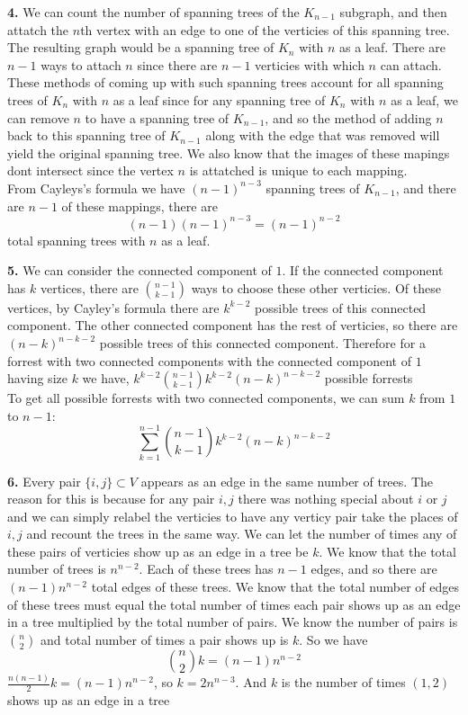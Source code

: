 \documentclass[12pt]{article}
\newenvironment{ques}{\vspace{2 ex}}{\vspace{2 ex}}
\theoremstyle{definition}
\begin{document}
\begin{ques}
	\textbf{4.}
		We can count the number of spanning trees of the $K_{n-1}$
		subgraph, and then attatch the $n$th vertex with an edge to one
		of the verticies of this spanning tree. The resulting graph
		would be a spanning tree of $K_n$ with $n$ as a leaf. There are
		$n-1$ ways to attach $n$ since there are $n-1$ verticies with
		which $n$ can attach. These methods of coming up with such
		spanning
		trees account for all spanning trees of $K_n$ with $n$ as a
		leaf since for any spanning tree of $K_n$ with
		$n$ as a leaf, we can remove $n$ to have a spanning tree of
		$K_{n-1}$, and so the method of adding $n$ back to this
		spanning tree of $K_{n-1}$ along with the edge that was removed
		will yield the original spanning tree. We also know that the
		images of these mapings dont intersect since the vertex $n$ is
		attatched is unique to each mapping.\\
		From Cayleys's formula we have $(n-1)^{n-3}$ spanning trees of
		$K_{n-1}$, and there are $n-1$ of these mappings, there are
		$$(n-1)(n-1)^{n-3} = (n-1)^{n-2}$$
		total spanning trees with $n$ as a leaf.
\end{ques}

\begin{ques}
	\textbf{5.}
		We can consider the connected component of $1$. If the
		connected component has $k$ vertices, there are
		$\binom{n-1}{k-1}$ ways to choose these other verticies. Of these
		vertices, by Cayley's formula there are $k^{k-2}$ possible
		trees of this connected component. The other connected
		component has the rest of verticies, so there are
		$(n-k)^{n-k-2}$ possible trees of this connected component.
		Therefore for a forrest with two connected components with the
		connected component of $1$ having size $k$ we have,
		$k^{k-2}\binom{n-1}{k-1}k^{k-2}(n-k)^{n-k-2}$ possible forrests\\
		To get all possible forrests with two connected components, we
		can sum $k$ from $1$ to $n-1$:
		$$\sum_{k=1}^{n-1}\binom{n-1}{k-1}k^{k-2}(n-k)^{n-k-2}$$
\end{ques}

\begin{ques}
	\textbf{6.}
		Every pair $\{i,j\} \subset V$ appears as an edge in the same
		number of trees. The reason for this is because for any pair
		$i,j$ there was nothing special about $i$ or $j$ and we can
		simply relabel the verticies to have any verticy pair take the
		places of $i,j$ and recount the trees in the same way. We can
		let the number of times any of these pairs of verticies show up
		as an edge in a tree be $k$. We know that the total number of
		trees is $n^{n-2}$. Each of these trees has $n-1$ edges, and so
		there are $(n-1)n^{n-2}$ total edges of these trees. We know
		that the total number of edges of these trees must equal the
		total number of times each pair shows up as an edge in a tree
		multiplied by the total number of pairs. We know the number of
		pairs is $\binom{n}{2}$ and total number of times a pair shows
		up is $k$. So we have 
		$$\binom{n}{2}k = (n-1)n^{n-2}$$
		$\frac{n(n-1)}{2}k = (n-1)n^{n-2}$, so $k = 2n^{n-3}$. And $k$
		is the number of times $(1,2)$ shows up as an edge in a tree
\end{ques}
\end{document}
